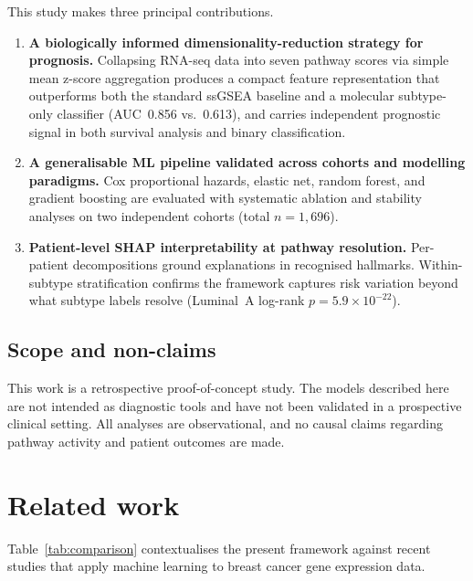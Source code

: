 \documentclass[review,12pt]{elsarticle}
\begin{document}
This study makes three principal contributions.

\begin{enumerate}
\item \textbf{A biologically informed dimensionality-reduction strategy
      for prognosis.}  Collapsing RNA-seq data into seven pathway scores
      via simple mean z-score aggregation produces a compact feature
      representation that outperforms both the standard ssGSEA baseline
      and a molecular subtype-only classifier (AUC~0.856 vs.~0.613), and
      carries independent prognostic signal in both survival analysis and
      binary classification.

\item \textbf{A generalisable ML pipeline validated across cohorts and modelling paradigms.}
      Cox proportional hazards, elastic net, random forest, and gradient boosting are evaluated
      with systematic ablation and stability analyses
      on two independent cohorts (total $n=1{,}696$).

\item \textbf{Patient-level SHAP interpretability at pathway resolution.}
      Per-patient decompositions ground explanations in recognised hallmarks.
      Within-subtype stratification confirms the framework captures risk
      variation beyond what subtype labels resolve
      (Luminal~A log-rank \(p = 5.9 \times 10^{-22}\)).
\end{enumerate}

\subsection{Scope and non-claims}
\label{sec:scope}

This work is a retrospective proof-of-concept study.  The models
described here are not intended as diagnostic tools and have not been
validated in a prospective clinical setting.  All analyses are
observational, and no causal claims regarding pathway activity and
patient outcomes are made.

\section{Related work}
\label{sec:related}

Table~\ref{tab:comparison} contextualises the present framework against
recent studies that apply machine learning to breast cancer gene
expression data.
\end{document}
